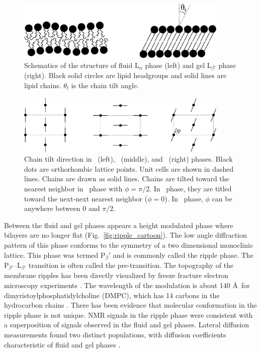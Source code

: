 \begin{figure}[htbp]
  \centering
  \includegraphics[width=0.9\textwidth]{figures/ripple/various_phases}
  \caption[]{Schematics of the structure of fluid L$_\alpha$ phase (left) and 
  gel L$_{\beta'}$ phase (right). Black solid circles are lipid headgroups 
  and solid lines are lipid chains. $\theta_t$ is the chain tilt angle.}
  \label{fig:various_phases}
\end{figure}

\begin{figure}[htbp]
  \centering
  \includegraphics[width=0.9\textwidth]{figures/ripple/gel_phase_packing}
  \caption{Chain tilt direction in \LbetaI\ (left), \LbetaF\ (middle), and
  \LbetaL\ (right) phases. Black dots are orthorhombic lattice points.
  Unit cells are shown in dashed lines.
  Chains are drawn as solid lines. Chains are tilted toward the
  nearest neighbor in \LbetaI\ phase with $\phi=\pi/2$. 
  In \LbetaF\ phase, they are titled toward the next-next nearest neighbor
  ($\phi=0$). In \LbetaL\ phase, $\phi$ can be anywhere between 0 and $\pi/2$.}
  \label{fig:gel_phase_packing}
\end{figure}

Between the fluid and gel phases appears a height modulated phase where
bilayers are no longer flat (Fig.~\ref{fig:ripple_cartoon}). 
The low angle diffraction pattern of this phase conforms to the symmetry
of a two dimensional monoclinic lattice. This phase was termed P$_\beta'$ 
and is commonly
called the ripple phase. The P$_{\beta'}$--L$_{\beta'}$ transition is often
called the pre-transition.
The topography of the membrane ripples has been directly
visualized by freeze fracture electron microscopy experiments 
\cite{ref:Luna77,ref:Copeland80,ref:Ruppel83,ref:Zasadzinski87,ref:Zasadzinski88}.
The wavelength of the modulation is about 140 \AA\ for 
dimyristoylphosphatidylcholine (DMPC),
which has 14 carbons in the hydrocarbon chains \cite{ref:Wack89}.
There has been evidence that molecular conformation in the ripple phase is not 
unique. NMR signals in the ripple phase \cite{ref:Wittebort81} were consistent
with a superposition of signals observed in the fluid and gel phases.
Lateral diffusion measurements found two distinct populations,
with diffusion coefficients characteristic of fluid and gel phases
\cite{ref:Schneider83}. 

